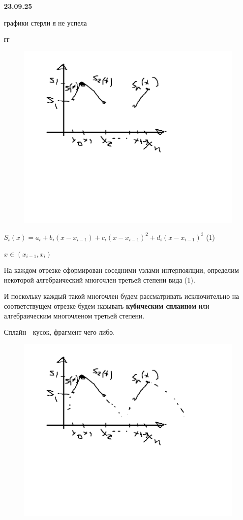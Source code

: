 \documentclass{article}
\begin{document}
\textbf{23.09.25}


графики стерли я не успела

гг



\vspace{10mm}

\begin{figure} [H]
    \includegraphics[width=0.70\linewidth]{Без име2ни.png}
\end{figure}


$S_i (x)=a_i+b_i(x-x_{i-1})+c_i(x-x_{i-1})^2+d_i(x-x_{i-1})^3 $ (1)

$x \in (x_{i-1}, x_i)$


На каждом отрезке сформирован соседними узлами интерпоялции, определим
некоторой алгебраический многочлен третьей степени вида (1).

И поскольку каждый такой многочлен будем рассматривать исключительно на соответствущем
отрезке будем называть \textbf{кубическим сплаином} или алгебраическим многочленом третьей степени.

Сплайн - кусок, фрагмент чего либо.


\begin{figure} [H]
    \includegraphics[width=0.70\linewidth]{Без име24ни.png}
\end{figure}
\end{document}
